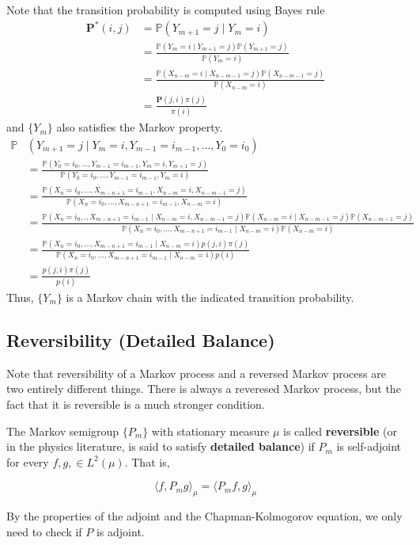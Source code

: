 \documentclass{article}
\begin{document}
      Note that the transition probability is computed using Bayes rule 
      \begin{align*}
          \mathbf{P^*}(i, j) & = \mathbb{P}(Y_{m + 1} = j \mid Y_m = i) \\
          & = \frac{\mathbb{P}(Y_m = i \mid Y_{m+1} = j) \mathbb{P}(Y_{m+1} = j)}{\mathbb{P}(Y_m = i)} \\
          & = \frac{\mathbb{P}(X_{n-m} = i \mid X_{n-m-1} = j) \mathbb{P}(X_{n-m-1} = j)}{\mathbb{P}(X_{n-m} = i)} \\
          & = \frac{\mathbf{P}(j, i) \pi(j)}{\pi(i)}
      \end{align*}
      and $\{Y_m\}$ also satisfies the Markov property. 
      \begin{align*}
          \mathbb{P}&(Y_{m+1} = j \mid Y_m = i, Y_{m-1} = i_{m-1}, \ldots, Y_0 = i_0) \\
          & = \frac{\mathbb{P}(Y_0 = i_0, \ldots, Y_{m-1} = i_{m-1}, Y_{m} = i, Y_{m+1} = j)}{\mathbb{P}(Y_0 = i_0, \ldots, Y_{m-1} = i_{m-1}, Y_{m} = i)} \\
          & = \frac{\mathbb{P}(X_n = i_0, \ldots, X_{m-n+1} = i_{m-1}, X_{n-m} = i, X_{n-m-1} = j)}{\mathbb{P}(X_n = i_0, \ldots, X_{m-n+1} = i_{m-1}, X_{n-m} = i)} \\
          & = \frac{\mathbb{P}(X_n = i_0, . , X_{m-n+1} = i_{m-1} \mid X_{n-m} = i, X_{n-m-1} = j) \mathbb{P}(X_{n-m} = i \mid X_{n-m-1} = j) \mathbb{P}(X_{n-m-1} = j)}{\mathbb{P}(X_n = i_0, \ldots, X_{m-n+1} = i_{m-1} \mid X_{n-m} = i) \mathbb{P}(X_{n-m} = i)} \\
          & = \frac{\mathbb{P}(X_n = i_0, \ldots, X_{m-n+1} = i_{m-1} \mid X_{n-m} = i) p(j, i) \pi(j)}{\mathbb{P}(X_n = i_0, \ldots, X_{m-n+1} = i_{m-1} \mid X_{n-m} = i) p(i)} \\
          & = \frac{p(j, i) \pi(j)}{p(i)}
      \end{align*}
      Thus, $\{Y_m\}$ is a Markov chain with the indicated transition probability. 

  \subsection{Reversibility (Detailed Balance)}

    Note that reversibility of a Markov process and a reversed Markov process are two entirely different things. There is always a reveresed Markov process, but the fact that it is reversible is a much stronger condition. 

    \begin{definition}[Reversibility]
      The Markov semigroup $\{P_m\}$ with stationary measure $\mu$ is called \textbf{reversible} (or in the physics literature, is said to satisfy \textbf{detailed balance}) if $P_m$ is self-adjoint for every $f, g, \in L^2 (\mu)$. That is, 

        \[\langle f, P_m g \rangle_\mu = \langle P_m f, g \rangle_\mu\]

      By the properties of the adjoint and the Chapman-Kolmogorov equation, we only need to check if $P$ is adjoint. 
    \end{definition}
\end{document}
